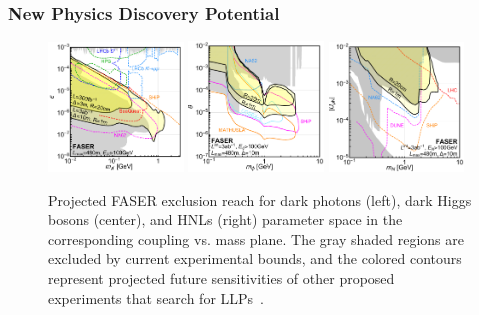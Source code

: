 
\subsubsection{New Physics Discovery Potential}
\label{sec:FASERReach}

\begin{figure}[t]
\centering
\includegraphics[width=0.32\textwidth]{figures/faser/Reach_DarkPhoton.pdf} 
\includegraphics[width=0.32\textwidth]{figures/faser/Reach_DarkHiggs.pdf} 
\includegraphics[width=0.32\textwidth]{figures/faser/Reach_HNL.pdf} 
\caption{
Projected FASER exclusion reach for dark photons (left), dark Higgs bosons (center), and HNLs (right) parameter space in the corresponding coupling vs. mass plane. The gray shaded regions are excluded by current experimental bounds, and the colored contours represent projected future sensitivities of other proposed experiments that search for LLPs~\cite{Alekhin:2015byh, Gardner:2015wea, Ilten:2015hya, Ilten:2016tkc, Moreno:2013mja, Chou:2016lxi, Evans:2017lvd, Gligorov:2017nwh, Adams:2013qkq, Drewes:2018gkc, Izaguirre:2015pga}.
}
\label{fig:Reach}
\end{figure}


